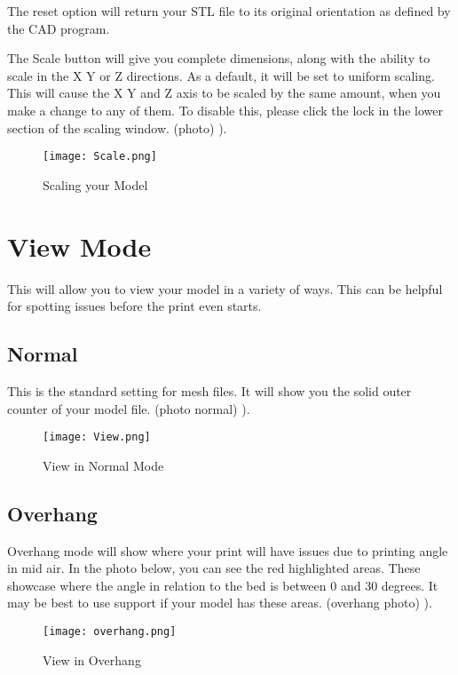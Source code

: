 The reset option will return your STL file to its original orientation as defined by the CAD program. 

The Scale button will give you complete dimensions, along with the ability to scale in the X Y or Z directions. As a default, it will be set to uniform scaling. This will cause the X Y and Z axis to be scaled by the same amount, when you make a change to any of them. To disable this, please click the lock in the lower section of the scaling window. (photo)
\pageref{fig:Scaling}).
\begin{figure}[hbt]
\centering
\texttt{[image: Scale.png]}
\caption{Scaling your Model}
\label{fig:Scaling your Model}
\end{figure}

\section{View Mode}

This will allow you to view your model in a variety of ways. This can be helpful for spotting issues before the print even starts. 

\subsection{Normal}

This is the standard setting for mesh files. It will show you the solid outer counter of your model file. (photo normal)
\pageref{fig:Rotating}).
\begin{figure}[hbt]
\centering
\texttt{[image: View.png]}
\caption{View in Normal Mode}
\label{fig:Normal View}
\end{figure}

\subsection{Overhang}

Overhang mode will show where your print will have issues due to printing angle in mid air. In the photo below, you can see the red highlighted areas. These showcase where the angle in relation to the bed is between 0 and 30 degrees. It may be best to use support if your model has these areas. (overhang photo)
\pageref{fig:Rotating}).
\begin{figure}[hbt]
\centering
\texttt{[image: overhang.png]}
\caption{View in Overhang}
\label{fig:Overhang View}
\end{figure}

